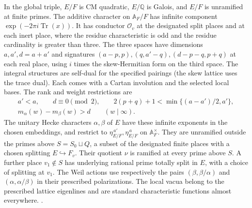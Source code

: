 In the global triple, \(E/F\) is CM quadratic, \(E/\mathbb Q\) is
Galois, and \(E/F\) is unramified at finite primes. The additive
character on \(\mathbb A_F/F\) has infinite component
\(\exp(-2\pi i\operatorname{Tr}(x))\). It has conductor \(\mathcal O_v\)
at the designated split places and at each inert place, where the residue
characteristic is odd and the residue cardinality is greater than three.
The three spaces have dimensions \(a,a',d=a+a'\) and signatures
\((a-p,p),(q,a'-q),(d-p-q,p+q)\) at each real place, using \(i\)
times the skew-Hermitian form on the third space. The integral structures
are self-dual for the specified pairings (the skew lattice uses the
trace dual). Each comes with a Cartan involution and the selected local
bases. The rank and weight restrictions are
\[
\begin{gathered}
a'<a,\qquad d\equiv0\pmod2,\qquad 2(p+q)+1<\min\{(a-a')/2,a'\},\\
m_\alpha(w)-m_\beta(w)>d\qquad(w\mid\infty).
\end{gathered}
\]
The unitary Hecke characters \(\alpha,\beta\) of \(E\) have these
infinite exponents in the chosen embeddings, and restrict to
\(\eta_{E/F}^{\,a'},\eta_{E/F}^{\,a}\) on \(\mathbb A_F^\times\).
They are unramified outside the primes above \(S=S_0\sqcup Q\), a
subset of the designated finite places with a chosen splitting
\(E\hookrightarrow F_v\). Their quotient \(\nu\) is ramified at
every prime above \(S\). A further place \(v_1\notin S\) has
underlying rational prime totally split in \(E\), with a choice of
splitting at \(v_1\). The Weil actions use respectively the pairs
\((\beta,\beta/\alpha)\) and \((\alpha,\alpha/\beta)\) in their
prescribed polarizations. The local vacua belong to the prescribed
lattice eigenlines and are standard characteristic functions almost
everywhere.
.

